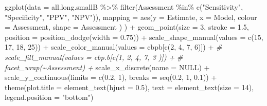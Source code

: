 \documentclass[
]{article}
\newenvironment{Shaded}{\begin{snugshade}}{\end{snugshade}}
\newcommand{\AttributeTok}[1]{\textcolor[rgb]{0.77,0.63,0.00}{#1}}
\newcommand{\CommentTok}[1]{\textcolor[rgb]{0.56,0.35,0.01}{\textit{#1}}}
\newcommand{\ConstantTok}[1]{\textcolor[rgb]{0.00,0.00,0.00}{#1}}
\newcommand{\DecValTok}[1]{\textcolor[rgb]{0.00,0.00,0.81}{#1}}
\newcommand{\FloatTok}[1]{\textcolor[rgb]{0.00,0.00,0.81}{#1}}
\newcommand{\FunctionTok}[1]{\textcolor[rgb]{0.00,0.00,0.00}{#1}}
\newcommand{\NormalTok}[1]{#1}
\newcommand{\SpecialCharTok}[1]{\textcolor[rgb]{0.00,0.00,0.00}{#1}}
\newcommand{\StringTok}[1]{\textcolor[rgb]{0.31,0.60,0.02}{#1}}
\begin{document}
\begin{Shaded}
\begin{Highlighting}[]
\FunctionTok{ggplot}\NormalTok{(}\AttributeTok{data =}\NormalTok{ all.long.smallB }\SpecialCharTok{\%\textgreater{}\%} 
         \FunctionTok{filter}\NormalTok{(Assessment }\SpecialCharTok{\%in\%} \FunctionTok{c}\NormalTok{(}\StringTok{"Sensitivity"}\NormalTok{, }\StringTok{"Specificity"}\NormalTok{, }\StringTok{"PPV"}\NormalTok{, }\StringTok{"NPV"}\NormalTok{)),}
       \AttributeTok{mapping =} \FunctionTok{aes}\NormalTok{(}\AttributeTok{y =}\NormalTok{ Estimate,}
                     \AttributeTok{x =}\NormalTok{ Model, }
                     \AttributeTok{colour =}\NormalTok{ Assessment,}
                     \AttributeTok{shape =}\NormalTok{ Assessment}
\NormalTok{                     )}
\NormalTok{       ) }\SpecialCharTok{+}
  \FunctionTok{geom\_point}\NormalTok{(}\AttributeTok{size =} \DecValTok{3}\NormalTok{, }\AttributeTok{stroke =} \FloatTok{1.5}\NormalTok{,}
             \AttributeTok{position =} \FunctionTok{position\_dodge}\NormalTok{(}\AttributeTok{width =} \FloatTok{0.75}\NormalTok{)) }\SpecialCharTok{+}
  \FunctionTok{scale\_shape\_manual}\NormalTok{(}\AttributeTok{values =} \FunctionTok{c}\NormalTok{(}\DecValTok{15}\NormalTok{, }\DecValTok{17}\NormalTok{, }\DecValTok{18}\NormalTok{, }\DecValTok{25}\NormalTok{)) }\SpecialCharTok{+}
  \FunctionTok{scale\_color\_manual}\NormalTok{(}\AttributeTok{values =}\NormalTok{ cbpb[}\FunctionTok{c}\NormalTok{(}\DecValTok{2}\NormalTok{, }\DecValTok{4}\NormalTok{, }\DecValTok{7}\NormalTok{, }\DecValTok{6}\NormalTok{)]) }\SpecialCharTok{+}
  \CommentTok{\# scale\_fill\_manual(values = cbp.b[c(1, 2, 4, 7, 3 )]) +}
  \CommentTok{\# facet\_wrap(\textasciitilde{}Assessment) +}
  \FunctionTok{scale\_x\_discrete}\NormalTok{(}\AttributeTok{name =} \ConstantTok{NULL}\NormalTok{) }\SpecialCharTok{+}
  \FunctionTok{scale\_y\_continuous}\NormalTok{(}\AttributeTok{limits =} \FunctionTok{c}\NormalTok{(}\FloatTok{0.2}\NormalTok{, }\DecValTok{1}\NormalTok{),}
                     \AttributeTok{breaks =} \FunctionTok{seq}\NormalTok{(}\FloatTok{0.2}\NormalTok{, }\DecValTok{1}\NormalTok{, }\FloatTok{0.1}\NormalTok{)) }\SpecialCharTok{+}
  \FunctionTok{theme}\NormalTok{(}\AttributeTok{plot.title =} \FunctionTok{element\_text}\NormalTok{(}\AttributeTok{hjust =} \FloatTok{0.5}\NormalTok{), }
        \AttributeTok{text =} \FunctionTok{element\_text}\NormalTok{(}\AttributeTok{size =} \DecValTok{14}\NormalTok{),}
        \AttributeTok{legend.position =} \StringTok{"bottom"}\NormalTok{)}
\end{Highlighting}
\end{Shaded}
\end{document}

